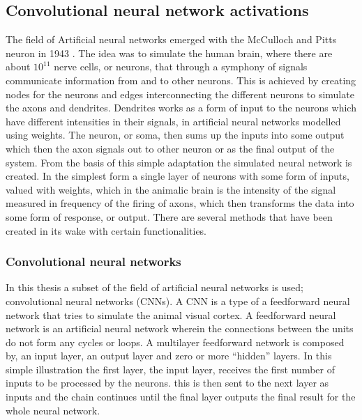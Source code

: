 

\subsection{Convolutional neural network activations}
\label{sec:vgg_feature}

The field of Artificial neural networks emerged with the McCulloch and Pitts neuron in 1943 . The idea was to simulate the human brain, where there are about $10^{11}$ nerve cells, or neurons, that through a symphony of signals communicate information from and to other neurons. This is achieved by creating nodes for the neurons and edges interconnecting the different neurons to simulate the axons and dendrites. Dendrites works as a form of input to the neurons which have different intensities in their signals, in artificial neural networks modelled using weights. The neuron, or soma, then sums up the inputs into some output which then the axon signals out to other neuron or as the final output of the system. From the basis of this simple adaptation the simulated neural network is created. In the simplest form a single layer of neurons with some form of inputs, valued with weights, which in the animalic brain is the intensity of the signal measured in frequency of the firing of axons, which then transforms the data into some form of response, or output. There are several methods that have been created in its wake with certain functionalities. 

\subsubsection{Convolutional neural networks}

In this thesis a subset of the field of artificial neural networks is used; convolutional neural networks (CNNs). A CNN is a type of a feedforward neural network  that tries to simulate the animal visual cortex. A feedforward neural network is an artificial neural network wherein the connections between the units do not form any cycles or loops. A multilayer feedforward network is composed by, an input layer, an output layer and zero or more ``hidden'' layers. In this simple illustration the first layer, the input layer, receives the first number of inputs to be processed by the neurons. this is then sent to the next layer as inputs and the chain continues until the final layer outputs the final result for the whole neural network. 

